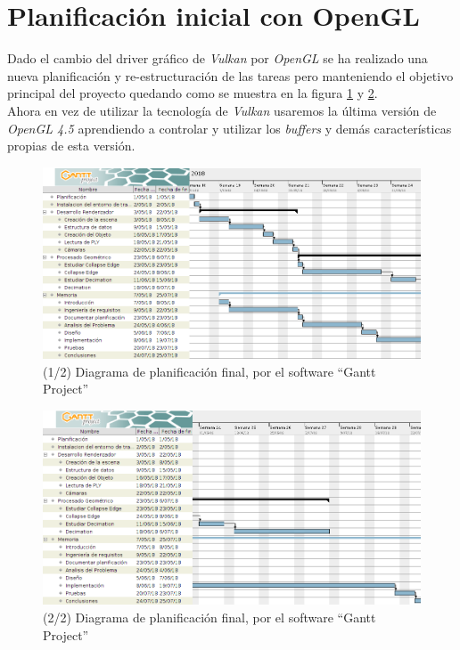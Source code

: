 \section{ Planificación inicial con OpenGL}
Dado el cambio del driver gráfico de \textit{Vulkan} por \textit{OpenGL} se ha realizado una nueva planificación y re-estructuración de las tareas pero manteniendo el objetivo principal del proyecto quedando como se muestra en la figura \ref{fig:planificacion_final.png} y \ref{fig:planificacion_final2.png}.\\

Ahora en vez de utilizar la tecnología de \textit{Vulkan} usaremos la última versión de \textit{OpenGL 4.5} aprendiendo a controlar y utilizar los \textit{buffers} y demás características propias de esta versión.

\begin{figure} %
	\centering
	\includegraphics[scale=0.4]{imagenes/Modelator_GP_planning_modi.png} 
	\caption{ (1/2) Diagrama de planificación final, por el software ``Gantt Project''} \label{fig:planificacion_final.png}
\end{figure}

\begin{figure} %
	\centering
	\includegraphics[scale=0.4]{imagenes/Modelator_GP_planning_modi2.png} 
	\caption{ (2/2) Diagrama de planificación final, por el software ``Gantt Project''} \label{fig:planificacion_final2.png}
\end{figure}

